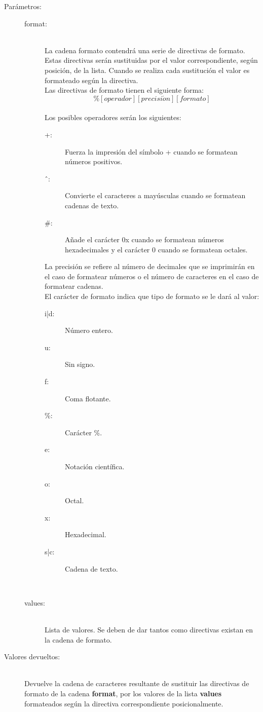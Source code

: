 \begin{description}
\item [Parámetros:] \hfill 
   \begin{description}
   \item[format:]  \hfill \\
      La cadena formato contendrá una serie de
		directivas de formato. Estas directivas serán sustituidas por el valor correspondiente, según posición, de la
		lista. Cuando se realiza cada sustitución el valor es formateado según la directiva. \\
		
		Las directivas de formato tienen el siguiente forma:
		$$\%[operador][precisi\acute{o}n][formato]$$ \\
		Los posibles operadores serán los siguientes:
		\begin{description}
			\item[ +:] Fuerza la impresión del símbolo + cuando se formatean números positivos.
			\item[ \^\ :] Convierte el caracteres a mayúsculas cuando se formatean cadenas de texto.
			\item[ \#:] Añade el carácter 0x cuando se formatean números hexadecimales y el carácter 0 cuando se formatean octales.
		\end{description} \hfill 
	
		La precisión se refiere al número de decimales que se imprimirán en el caso de formatear
		números o el número de caracteres en el caso de formatear cadenas. \\		

		El carácter de formato indica que tipo de formato se le dará al valor: 
		\begin{description}
			\item[  i|d:] Número entero.
			\item[  u:] Sin signo.
			\item[  f:] Coma flotante.
			\item[  \%:] Carácter \%.
			\item[  e:] Notación científica.
			\item[  o:] Octal.
			\item[  x:] Hexadecimal.
			\item[  s|c:] Cadena de texto.
		\end{description} \hfill \\
   \item[values:] \hfill \\ Lista de valores. Se deben de dar tantos como directivas existan en la cadena de formato.
      
   \end{description}
\item[Valores devueltos:] \hfill \\
   Devuelve la cadena de caracteres resultante de sustituir las directivas de formato de la cadena \textbf{format}, por los valores  de la lista \textbf{values} formateados 
   según la directiva correspondiente posicionalmente.
\end{description}

